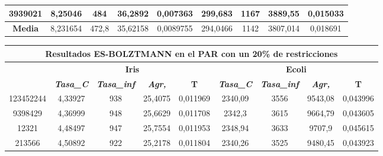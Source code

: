 \documentclass[12pt, spanish]{article}
\begin{document}
\begin{table}[H]
\begin{tabular}{|c|c|c|c|c|c|c|c|c|}
3939021           & 8,25046                   & 484                         & 36,2892                & 0,007363   & 299,683                   & 1167                        & 3889,55                & 0,015033   \\ \hline
\textbf{Media}    & 8,231654                  & 472,8                       & 35,62158               & 0,0089755  & 294,0466                  & 1142                        & 3807,014               & 0,018691   \\ \hline
\end{tabular}
\end{table}

\begin{table}[H]
\begin{tabular}{|c|c|c|c|c|c|c|c|c|}
\hline
\multicolumn{9}{|c|}{\textbf{Resultados ES-BOLZTMANN en el PAR con un 20\% de restricciones}}                                                                                                                     \\ \hline
\multirow{2}{*}{} & \multicolumn{4}{c|}{\textbf{Iris}}                                                            & \multicolumn{4}{c|}{\textbf{Ecoli}}                                                           \\ \cline{2-9} 
                  & \textit{\textbf{Tasa\_C}} & \textit{\textbf{Tasa\_inf}} & \textit{\textbf{Agr,}} & \textbf{T} & \textit{\textbf{Tasa\_C}} & \textit{\textbf{Tasa\_inf}} & \textit{\textbf{Agr,}} & \textbf{T} \\ \hline
123452244         & 4,33927                   & 938                         & 25,4075                & 0,011969   & 2340,09                   & 3556                        & 9543,08                & 0,043996   \\ \hline
9398429           & 4,36999                   & 948                         & 25,6629                & 0,011708   & 2342,3                    & 3615                        & 9664,79                & 0,043605   \\ \hline
12321             & 4,48497                   & 947                         & 25,7554                & 0,011953   & 2348,94                   & 3633                        & 9707,9                 & 0,045615   \\ \hline
213566            & 4,50892                   & 922                         & 25,2178                & 0,011804   & 2340,26                   & 3525                        & 9480,45                & 0,043923   \\ \hline

\end{tabular}
\end{table}
\end{document}
